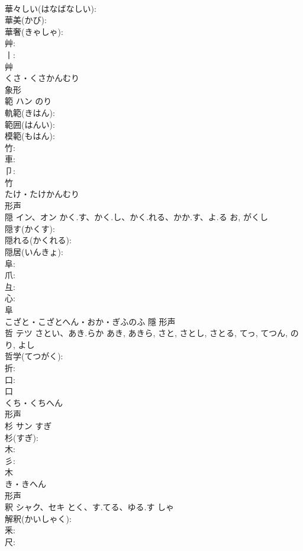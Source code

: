 \documentclass[8pt]{extreport}
\begin{document}
\begin{CJK}{UTF8}{min}
\\	華々しい(はなばなしい): 
\\	華美(かび): 
\\	華奢(きゃしゃ): 
\\	艸: 
\\	丨: 
\\	艸	
\\	くさ・くさかんむり	
\\	象形 
\\	範	ハン		のり	
\\	軌範(きはん): 
\\	範囲(はんい): 
\\	模範(もはん): 
\\	竹: 
\\	車: 
\\	卩: 
\\	竹	
\\	たけ・たけかんむり	
\\	形声 
\\	隠	イン、オン	かく.す、かく.し、かく.れる、かか.す、よ.る	お, がくし	
\\	隠す(かくす): 
\\	隠れる(かくれる): 
\\	隠居(いんきょ): 
\\	阜: 
\\	爪: 
\\	彑: 
\\	心: 
\\	阜	
\\	こざと・こざとへん・おか・ぎふのふ	隱	形声 
\\	哲	テツ	さとい、あき.らか	あき, あきら, さと, さとし, さとる, てっ, てつん, のり, よし	
\\	哲学(てつがく): 
\\	折: 
\\	口: 
\\	口	
\\	くち・くちへん	
\\	形声 
\\	杉	サン	すぎ		
\\	杉(すぎ): 
\\	木: 
\\	彡: 
\\	木	
\\	き・きへん	
\\	形声 
\\	釈	シャク、セキ	とく、す.てる、ゆる.す	しゃ	
\\	解釈(かいしゃく): 
\\	釆: 
\\	尺: 

\end{CJK}
\end{document}

